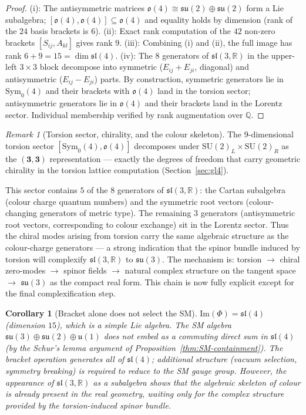\documentclass[11pt,a4paper]{article}
\theoremstyle{plain}
\newtheorem{corollary}[theorem]{Corollary}
\theoremstyle{definition}
\theoremstyle{remark}
\newtheorem{remark}[theorem]{Remark}
\begin{document}
\begin{proof}
(i): The antisymmetric matrices $\mathfrak{o}(4) \cong \mathfrak{su}(2)\oplus\mathfrak{su}(2)$ form a Lie subalgebra;
$[\mathfrak{o}(4),\mathfrak{o}(4)]\subseteq\mathfrak{o}(4)$ and equality holds by dimension (rank of the $24$ basis brackets is $6$).
(ii): Exact rank computation of the $42$ non-zero brackets $[S_{ij},A_{kl}]$ gives rank $9$.
(iii): Combining (i) and (ii), the full image has rank $6+9=15 = \dim\mathfrak{sl}(4)$.
(iv): The $8$ generators of $\mathfrak{sl}(3,\mathbb{R})$ in the upper-left 
$3\times 3$ block decompose into symmetric ($E_{ij}+E_{ji}$, diagonal) and 
antisymmetric ($E_{ij}-E_{ji}$) parts.  By construction, symmetric generators 
lie in $\mathrm{Sym}_0(4)$ and their brackets with $\mathfrak{o}(4)$ land in 
the torsion sector; antisymmetric generators lie in $\mathfrak{o}(4)$ and their 
brackets land in the Lorentz sector.  Individual membership verified by rank 
augmentation over $\mathbb{Q}$.
\end{proof}

\begin{remark}[Torsion sector, chirality, and the colour skeleton]
The $9$-dimensional torsion sector $[\mathrm{Sym}_0(4),\mathfrak{o}(4)]$ decomposes under $\mathrm{SU}(2)_L\times\mathrm{SU}(2)_R$
as the $(\mathbf{3},\mathbf{3})$ representation --- exactly the degrees of freedom that carry geometric chirality
in the torsion lattice computation (Section~\ref{sec:gl4}).

This sector contains $5$ of the $8$ generators of $\mathfrak{sl}(3,\mathbb{R})$:
the Cartan subalgebra (colour charge quantum numbers) and the symmetric root
vectors (colour-changing generators of metric type).  The remaining $3$ generators
(antisymmetric root vectors, corresponding to colour exchange) sit in the Lorentz
sector.  Thus the chiral modes arising from torsion carry the same algebraic
structure as the colour-charge generators --- a strong indication that the spinor
bundle induced by torsion will complexify $\mathfrak{sl}(3,\mathbb{R})$ to
$\mathfrak{su}(3)$.  The mechanism is:
torsion $\to$ chiral zero-modes $\to$ spinor fields $\to$ natural complex
structure on the tangent space $\to$ $\mathfrak{su}(3)$ as the compact real form.
This chain is now fully explicit except for the final complexification step.
\end{remark}

\begin{corollary}[Bracket alone does not select the SM]
$\mathrm{Im}(\Phi) = \mathfrak{sl}(4)$ (dimension $15$), which is a simple Lie algebra.
The SM algebra $\mathfrak{su}(3) \oplus \mathfrak{su}(2) \oplus \mathfrak{u}(1)$
does not embed as a commuting direct sum in $\mathfrak{sl}(4)$ 
(by the Schur's lemma argument of Proposition~\ref{thm:SM-containment}).
The bracket operation generates \emph{all} of $\mathfrak{sl}(4)$;
additional structure (vacuum selection, symmetry breaking) is required 
to reduce to the SM gauge group.  However, the appearance of $\mathfrak{sl}(3,\mathbb{R})$
as a subalgebra shows that the algebraic skeleton of colour is already present in the
real geometry, waiting only for the complex structure provided by the torsion-induced
spinor bundle.
\end{corollary}
\end{document}
